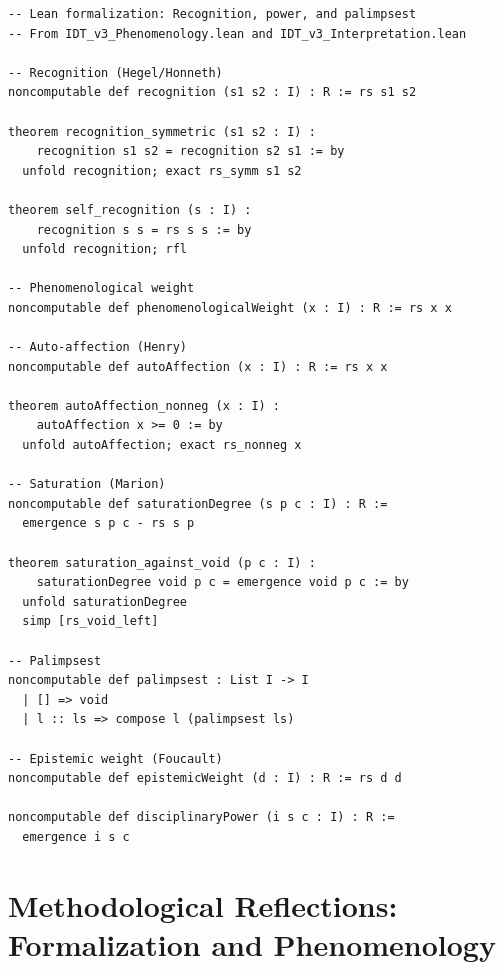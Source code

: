 \begin{lstlisting}
-- Lean formalization: Recognition, power, and palimpsest
-- From IDT_v3_Phenomenology.lean and IDT_v3_Interpretation.lean

-- Recognition (Hegel/Honneth)
noncomputable def recognition (s1 s2 : I) : R := rs s1 s2

theorem recognition_symmetric (s1 s2 : I) :
    recognition s1 s2 = recognition s2 s1 := by
  unfold recognition; exact rs_symm s1 s2

theorem self_recognition (s : I) :
    recognition s s = rs s s := by
  unfold recognition; rfl

-- Phenomenological weight
noncomputable def phenomenologicalWeight (x : I) : R := rs x x

-- Auto-affection (Henry)
noncomputable def autoAffection (x : I) : R := rs x x

theorem autoAffection_nonneg (x : I) :
    autoAffection x >= 0 := by
  unfold autoAffection; exact rs_nonneg x

-- Saturation (Marion)
noncomputable def saturationDegree (s p c : I) : R :=
  emergence s p c - rs s p

theorem saturation_against_void (p c : I) :
    saturationDegree void p c = emergence void p c := by
  unfold saturationDegree
  simp [rs_void_left]

-- Palimpsest
noncomputable def palimpsest : List I -> I
  | [] => void
  | l :: ls => compose l (palimpsest ls)

-- Epistemic weight (Foucault)
noncomputable def epistemicWeight (d : I) : R := rs d d

noncomputable def disciplinaryPower (i s c : I) : R :=
  emergence i s c
\end{lstlisting}

\section{Methodological Reflections: Formalization and Phenomenology}

